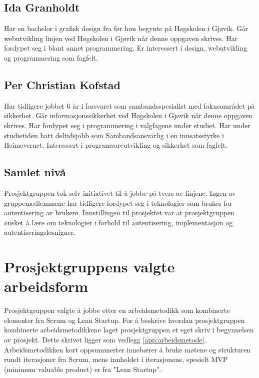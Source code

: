 \subsection*{Ida Granholdt}
Har en bachelor i grafisk design fra før hun begynte på Høgskolen i Gjøvik.
Går webutvikling linjen ved Høgskolen i Gjøvik når denne oppgaven skrives. Har fordypet seg i blant annet programmering. Er interessert i design, webutvikling og programmering som fagfelt. 

\subsection*{Per Christian Kofstad}
Har tidligere jobbet 6 år i forsvaret som sambandsspesialist med fokusområdet på sikkerhet. 
Går informasjonssikkerhet ved Høgskolen i Gjøvik når denne oppgaven skrives. Har fordypet seg i programmering i valgfagene under studiet. Har under studietiden hatt deltidsjobb som Sambandsansvarlig i en innsatsstyrke i Heimevernet. Interessert i programvareutvikling og sikkerhet som fagfelt. 

\subsection*{Samlet nivå}
Prosjektgruppen tok selv initiativet til å jobbe på tvers av linjene. Ingen av gruppemedlemmene har tidligere fordypet seg i teknologier som brukes for autentisering av brukere. Innstillingen til prosjektet var at prosjektgruppen ønsket å lære om teknologier i forhold til autentisering, implementasjon og autentiseringsløsnigner. 

\section{Prosjektgruppens valgte arbeidsform}
\label{sec:innledning_prosjekgruppensValgteArbeidsform}
Prosjektgruppen valgte å jobbe etter en arbeidsmetodikk som kombinerte elementer fra Scrum og Lean Startup. For å beskrive hvordan prosjektgruppen kombinerte arbeidsmetodikkene laget prosjektgruppen et eget skriv i begynnelsen av prosjekt. Dette skrivet ligger som vedlegg \ref{app:arbeidsmetode}. Arbeidsmetodikken kort oppsummerter innebærer å bruke møtene og strukturen rundt iterasjoner fra Scrum, mens innholdet i iterasjonene, spesielt MVP (minimum valuable product) er fra "Lean Startup". 

